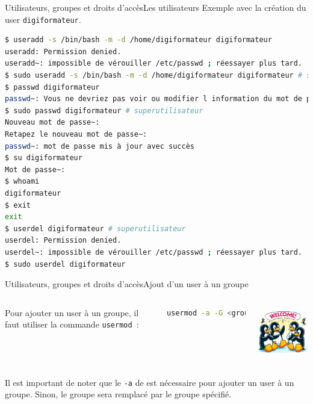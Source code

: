 \documentclass{beamer}
\begin{document}
    \begin{frame}[fragile]{Utilisateurs, groupes et droits d'accès}{Les utilisateurs}
        Exemple avec la création du user \lstinline{digiformateur}.
        \begin{lstlisting}[language=bash]
$ useradd -s /bin/bash -m -d /home/digiformateur digiformateur
useradd: Permission denied.
useradd~: impossible de vérouiller /etc/passwd ; réessayer plus tard.
$ sudo useradd -s /bin/bash -m -d /home/digiformateur digiformateur # sudo
$ passwd digiformateur
passwd~: Vous ne devriez pas voir ou modifier l information du mot de passe pour digiformateur.
$ sudo passwd digiformateur # superutilisateur
Nouveau mot de passe~: 
Retapez le nouveau mot de passe~: 
passwd~: mot de passe mis à jour avec succès
$ su digiformateur
Mot de passe~: 
$ whoami
digiformateur
$ exit
exit
$ userdel digiformateur # superutilisateur
userdel: Permission denied.
userdel~: impossible de vérouiller /etc/passwd ; réessayer plus tard.
$ sudo userdel digiformateur
        \end{lstlisting}
    \end{frame}

    \begin{frame}[fragile]{Utilisateurs, groupes et droits d'accès}{Ajout d'un user à un groupe}
        \begin{columns}
            Pour ajouter un user à un groupe, il faut utiliser la commande \lstinline{usermod}~:
            \begin{lstlisting}[language=bash]
usermod -a -G <group> <user name>
            \end{lstlisting}
            \centering
            \includegraphics[width=4cm]{image/tux-welcome}
        \end{columns}
        \begin{dangercolorbox}
            Il est important de noter que le \lstinline{-a} de  est nécessaire pour ajouter un user à un groupe.
            Sinon, le groupe sera remplacé par le groupe spécifié.
        \end{dangercolorbox}
    \end{frame}
\end{document}
